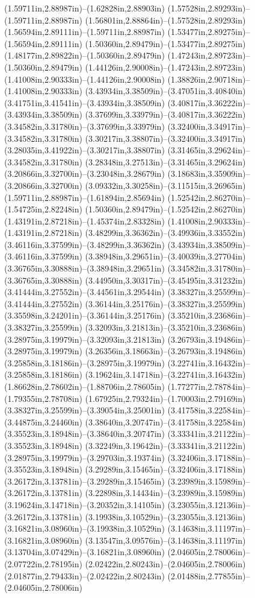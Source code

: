 (1.59711in,2.88987in)--(1.62828in,2.88903in) (1.57528in,2.89293in)--(1.59711in,2.88987in) (1.56801in,2.88864in)--(1.57528in,2.89293in) (1.56594in,2.89111in)--(1.59711in,2.88987in) (1.53477in,2.89275in)--(1.56594in,2.89111in) (1.50360in,2.89479in)--(1.53477in,2.89275in) (1.48177in,2.89822in)--(1.50360in,2.89479in) (1.47243in,2.89723in)--(1.50360in,2.89479in) (1.44126in,2.90008in)--(1.47243in,2.89723in) (1.41008in,2.90333in)--(1.44126in,2.90008in) (1.38826in,2.90718in)--(1.41008in,2.90333in) (3.43934in,3.38509in)--(3.47051in,3.40840in) (3.41751in,3.41541in)--(3.43934in,3.38509in) (3.40817in,3.36222in)--(3.43934in,3.38509in) (3.37699in,3.33979in)--(3.40817in,3.36222in) (3.34582in,3.31780in)--(3.37699in,3.33979in) (3.32400in,3.34917in)--(3.34582in,3.31780in) (3.30217in,3.38807in)--(3.32400in,3.34917in) (3.28035in,3.41922in)--(3.30217in,3.38807in) (3.31465in,3.29624in)--(3.34582in,3.31780in) (3.28348in,3.27513in)--(3.31465in,3.29624in) (3.20866in,3.32700in)--(3.23048in,3.28679in) (3.18683in,3.35909in)--(3.20866in,3.32700in) (3.09332in,3.30258in)--(3.11515in,3.26965in) (1.59711in,2.88987in)--(1.61894in,2.85694in) (1.52542in,2.86270in)--(1.54725in,2.82248in) (1.50360in,2.89479in)--(1.52542in,2.86270in) (1.43191in,2.87218in)--(1.45374in,2.83328in) (1.41008in,2.90333in)--(1.43191in,2.87218in) (3.48299in,3.36362in)--(3.49936in,3.33552in) (3.46116in,3.37599in)--(3.48299in,3.36362in) (3.43934in,3.38509in)--(3.46116in,3.37599in) (3.38948in,3.29651in)--(3.40039in,3.27704in) (3.36765in,3.30888in)--(3.38948in,3.29651in) (3.34582in,3.31780in)--(3.36765in,3.30888in) (3.44950in,3.30317in)--(3.45495in,3.31232in) (3.41444in,3.27552in)--(3.44561in,3.29544in) (3.38327in,3.25599in)--(3.41444in,3.27552in) (3.36144in,3.25176in)--(3.38327in,3.25599in) (3.35598in,3.24201in)--(3.36144in,3.25176in) (3.35210in,3.23686in)--(3.38327in,3.25599in) (3.32093in,3.21813in)--(3.35210in,3.23686in) (3.28975in,3.19979in)--(3.32093in,3.21813in) (3.26793in,3.19486in)--(3.28975in,3.19979in) (3.26356in,3.18663in)--(3.26793in,3.19486in) (3.25858in,3.18186in)--(3.28975in,3.19979in) (3.22741in,3.16432in)--(3.25858in,3.18186in) (3.19624in,3.14718in)--(3.22741in,3.16432in) (1.86628in,2.78602in)--(1.88706in,2.78605in) (1.77277in,2.78784in)--(1.79355in,2.78708in) (1.67925in,2.79324in)--(1.70003in,2.79169in) (3.38327in,3.25599in)--(3.39054in,3.25001in) (3.41758in,3.22584in)--(3.44875in,3.24460in) (3.38640in,3.20747in)--(3.41758in,3.22584in) (3.35523in,3.18948in)--(3.38640in,3.20747in) (3.33341in,3.21122in)--(3.35523in,3.18948in) (3.32249in,3.19642in)--(3.33341in,3.21122in) (3.28975in,3.19979in)--(3.29703in,3.19374in) (3.32406in,3.17188in)--(3.35523in,3.18948in) (3.29289in,3.15465in)--(3.32406in,3.17188in) (3.26172in,3.13781in)--(3.29289in,3.15465in) (3.23989in,3.15989in)--(3.26172in,3.13781in) (3.22898in,3.14434in)--(3.23989in,3.15989in) (3.19624in,3.14718in)--(3.20352in,3.14105in) (3.23055in,3.12136in)--(3.26172in,3.13781in) (3.19938in,3.10529in)--(3.23055in,3.12136in) (3.16821in,3.08960in)--(3.19938in,3.10529in) (3.14638in,3.11197in)--(3.16821in,3.08960in) (3.13547in,3.09576in)--(3.14638in,3.11197in) (3.13704in,3.07429in)--(3.16821in,3.08960in) (2.04605in,2.78006in)--(2.07722in,2.78195in) (2.02422in,2.80243in)--(2.04605in,2.78006in) (2.01877in,2.79433in)--(2.02422in,2.80243in) (2.01488in,2.77855in)--(2.04605in,2.78006in) 